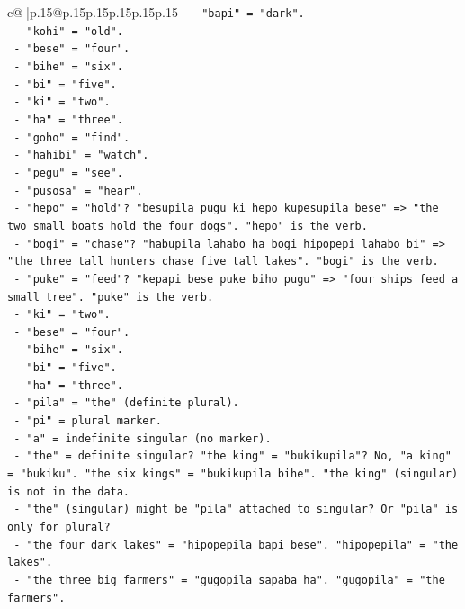 \documentclass{article}
\begin{document}
{\begin{supertabular}{c@{$\;$}|p{.15\linewidth}@{}p{.15\linewidth}p{.15\linewidth}p{.15\linewidth}p{.15\linewidth}p{.15\linewidth}}
{{{\texttt{  {-} "bapi" = "dark".} \\
\texttt{  {-} "kohi" = "old".} \\
\texttt{  {-} "bese" = "four".} \\
\texttt{  {-} "bihe" = "six".} \\
\texttt{  {-} "bi" = "five".} \\
\texttt{  {-} "ki" = "two".} \\
\texttt{  {-} "ha" = "three".} \\
\texttt{  {-} "goho" = "find".} \\
\texttt{  {-} "hahibi" = "watch".} \\
\texttt{  {-} "pegu" = "see".} \\
\texttt{  {-} "pusosa" = "hear".} \\
\texttt{  {-} "hepo" = "hold"? "besupila pugu ki hepo kupesupila bese" => "the two small boats hold the four dogs". "hepo" is the verb.} \\
\texttt{  {-} "bogi" = "chase"? "habupila lahabo ha bogi hipopepi lahabo bi" => "the three tall hunters chase five tall lakes". "bogi" is the verb.} \\
\texttt{  {-} "puke" = "feed"? "kepapi bese puke biho pugu" => "four ships feed a small tree". "puke" is the verb.} \\
\texttt{  {-} "ki" = "two".} \\
\texttt{  {-} "bese" = "four".} \\
\texttt{  {-} "bihe" = "six".} \\
\texttt{  {-} "bi" = "five".} \\
\texttt{  {-} "ha" = "three".} \\
\texttt{  {-} "pila" = "the" (definite plural).} \\
\texttt{  {-} "pi" = plural marker.} \\
\texttt{  {-} "a" = indefinite singular (no marker).} \\
\texttt{  {-} "the" = definite singular? "the king" = "bukikupila"? No, "a king" = "bukiku". "the six kings" = "bukikupila bihe". "the king" (singular) is not in the data.} \\
\texttt{  {-} "the" (singular) might be "pila" attached to singular? Or "pila" is only for plural?} \\
\texttt{  {-} "the four dark lakes" = "hipopepila bapi bese". "hipopepila" = "the lakes".} \\
\texttt{  {-} "the three big farmers" = "gugopila sapaba ha". "gugopila" = "the farmers".} \\
}}}
\end{supertabular}}
\end{document}
